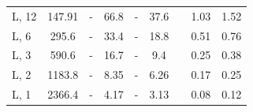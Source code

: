 \begin{table}[!h]
\begin{tabular}{p{1cm}|cc|cc|cc|cc}
    L, 12                                                               & 147.91 & - & 66.8  & - & 37.6  &   & 1.03 & 1.52 \\
    L, 6                                                                 & 295.6  & - & 33.4  & - & 18.8  &   & 0.51 & 0.76 \\
    L, 3                                                                 & 590.6  & - & 16.7  & - & 9.4   &   & 0.25 & 0.38 \\
    L, 2                                                                 & 1183.8 & - & 8.35  & - & 6.26  &   & 0.17 & 0.25 \\
    L, 1                                                                 & 2366.4 & - & 4.17  & - & 3.13  &   & 0.08 & 0.12 \\\hline \hline

  \end{tabular}
\end{table}
